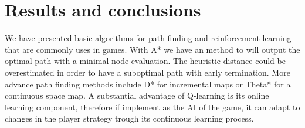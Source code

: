 \documentclass[12pt]{article}
\begin{document}
\section{Results and conclusions}

We have presented basic algorithms for path finding and reinforcement learning that are commonly uses in games.
With A* we have an method to will output the optimal path with a minimal node evaluation.
The heuristic distance could be overestimated in order to have a suboptimal path with early termination.
More advance path finding methods include D*\cite{Stentz1993} for incremental maps or Theta*\cite{Nash2007} for a continuous space map.
A substantial advantage of Q-learning is its online learning component, therefore if implement as the AI of the game, it can adapt to changes in the player strategy trough its continuous learning process.



\end{document}
